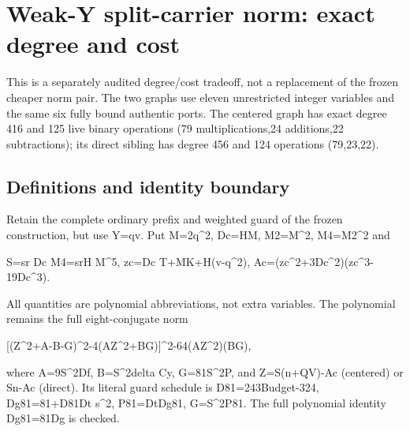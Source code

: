 \section{Weak-Y split-carrier norm: exact degree and cost}



This is a separately audited degree/\allowbreak{}cost tradeoff, not a replacement of the frozen cheaper norm pair. The two graphs use eleven unrestricted integer variables and the same six fully bound authentic ports. The centered graph has exact degree 416 and 125 live binary operations (79 multiplications,24 additions,22 subtractions); its direct sibling has degree 456 and 124 operations (79,23,22).



\subsection*{Definitions and identity boundary}



Retain the complete ordinary prefix and weighted guard of the frozen construction, but use Y=\allowbreak{}qv. Put M=\allowbreak{}2q\textasciicircum{}\allowbreak{}2, Dc=\allowbreak{}HM, M2=\allowbreak{}M\textasciicircum{}\allowbreak{}2, M4=\allowbreak{}M2\textasciicircum{}\allowbreak{}2 and



S=\allowbreak{}sr Dc M4=\allowbreak{}srH M\textasciicircum{}\allowbreak{}5, zc=\allowbreak{}Dc T+\allowbreak{}MK+\allowbreak{}H(v-q\textasciicircum{}\allowbreak{}2), Ac=\allowbreak{}(zc\textasciicircum{}\allowbreak{}2+\allowbreak{}3Dc\textasciicircum{}\allowbreak{}2)(zc\textasciicircum{}\allowbreak{}3-19Dc\textasciicircum{}\allowbreak{}3).



All quantities are polynomial abbreviations, not extra variables. The polynomial remains the full eight-conjugate norm



[(Z\textasciicircum{}\allowbreak{}2+\allowbreak{}A-B-G)\textasciicircum{}\allowbreak{}2-4(AZ\textasciicircum{}\allowbreak{}2+\allowbreak{}BG)]\textasciicircum{}\allowbreak{}2-64(AZ\textasciicircum{}\allowbreak{}2)(BG),



where A=\allowbreak{}9S\textasciicircum{}\allowbreak{}2Df, B=\allowbreak{}S\textasciicircum{}\allowbreak{}2delta Cy, G=\allowbreak{}81S\textasciicircum{}\allowbreak{}2P, and Z=\allowbreak{}S(n+\allowbreak{}QV)-Ac (centered) or Sn-Ac (direct). Its literal guard schedule is D81=\allowbreak{}243Budget-324, Dg81=\allowbreak{}81+\allowbreak{}D81Dt s\textasciicircum{}\allowbreak{}2, P81=\allowbreak{}DtDg81, G=\allowbreak{}S\textasciicircum{}\allowbreak{}2P81. The full polynomial identity Dg81=\allowbreak{}81Dg is checked.




